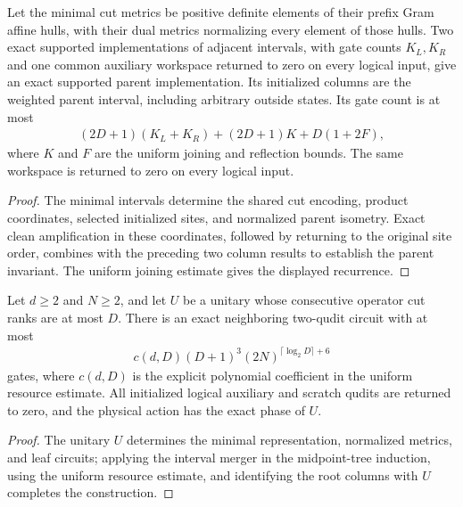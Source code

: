 \begin{lemma}
    \label{thm:mpu_actual_minimal_interval_merger}
    \leanok
    Let the minimal cut metrics be positive definite elements of their prefix Gram
    affine hulls, with their dual metrics normalizing every element of those hulls.
    Two exact supported implementations of adjacent intervals, with gate counts
    $K_L,K_R$ and one common auxiliary workspace returned to zero on every logical
    input, give an exact supported parent implementation. Its initialized columns
    are the weighted parent interval, including arbitrary outside states.
    Its gate count is at most
    \begin{align}
        (2D+1)(K_L+K_R)+(2D+1)K+D(1+2F),
    \end{align}
    where $K$ and $F$ are the uniform joining and reflection bounds. The same
    workspace is returned to zero on every logical input.
\end{lemma}
\begin{proof}\leanok
    The minimal intervals determine the shared cut encoding, product coordinates, selected initialized
    sites, and normalized parent isometry.
    Exact clean amplification in these coordinates, followed by returning to the original
    site order, combines with the preceding two column results to establish the parent invariant.
    The uniform joining estimate gives the displayed recurrence.
\end{proof}

\begin{theorem}
    \label{thm:mpu_explicit_exact_bounded_cut_circuit}
    \leanok
    Let $d\geq2$ and $N\geq2$, and let $U$ be a unitary whose consecutive operator
    cut ranks are at most $D$. There is an exact neighboring two-qudit circuit with
    at most
    \begin{align}
        c(d,D)(D+1)^3(2N)^{\lceil\log_2 D\rceil+6}
    \end{align}
    gates, where $c(d,D)$ is the explicit polynomial coefficient in the uniform
    resource estimate. All initialized logical auxiliary and scratch qudits are
    returned to zero, and the physical action has the exact phase of $U$.
\end{theorem}
\begin{proof}\leanok
    The unitary $U$ determines the minimal representation, normalized metrics, and leaf
    circuits; applying the interval merger in the midpoint-tree induction, using the uniform
    resource estimate, and identifying the root columns with $U$ completes the construction.
\end{proof}

